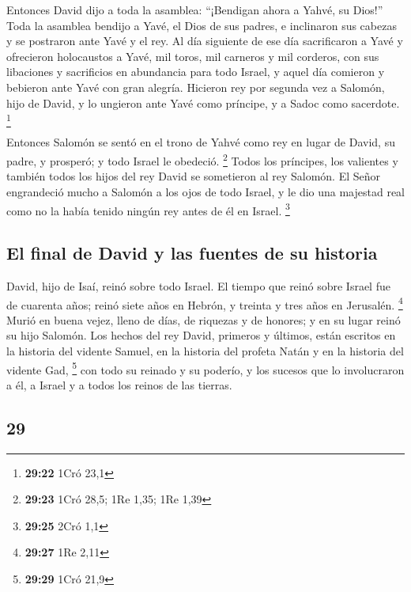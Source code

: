 \begin{paracol}{2}
 Entonces David dijo a toda la asamblea: ``¡Bendigan
ahora a Yahvé, su Dios!'' Toda la asamblea bendijo a Yavé, el Dios de
sus padres, e inclinaron sus cabezas y se postraron ante Yavé y el rey.
 Al día siguiente de ese día sacrificaron a Yavé y
ofrecieron holocaustos a Yavé, mil toros, mil carneros y mil corderos,
con sus libaciones y sacrificios en abundancia para todo Israel,
 y aquel día comieron y bebieron ante Yavé con gran
alegría. Hicieron rey por segunda vez a Salomón, hijo de David, y lo
ungieron ante Yavé como príncipe, y a Sadoc como sacerdote. \footnote{\textbf{29:22}
  1Cró 23,1}

 Entonces Salomón se sentó en el trono de Yahvé como rey
en lugar de David, su padre, y prosperó; y todo Israel le obedeció.
\footnote{\textbf{29:23} 1Cró 28,5; 1Re 1,35; 1Re 1,39} 
Todos los príncipes, los valientes y también todos los hijos del rey
David se sometieron al rey Salomón.  El Señor engrandeció
mucho a Salomón a los ojos de todo Israel, y le dio una majestad real
como no la había tenido ningún rey antes de él en Israel. \footnote{\textbf{29:25}
  2Cró 1,1}

\hypertarget{el-final-de-david-y-las-fuentes-de-su-historia}{%
\subsection{El final de David y las fuentes de su
historia}\label{el-final-de-david-y-las-fuentes-de-su-historia}}

 David, hijo de Isaí, reinó sobre todo Israel.
 El tiempo que reinó sobre Israel fue de cuarenta años;
reinó siete años en Hebrón, y treinta y tres años en Jerusalén.
\footnote{\textbf{29:27} 1Re 2,11}  Murió en buena vejez,
lleno de días, de riquezas y de honores; y en su lugar reinó su hijo
Salomón.  Los hechos del rey David, primeros y últimos,
están escritos en la historia del vidente Samuel, en la historia del
profeta Natán y en la historia del vidente Gad, \footnote{\textbf{29:29}
  1Cró 21,9}  con todo su reinado y su poderío, y los
sucesos que lo involucraron a él, a Israel y a todos los reinos de las
tierras. \switchcolumn \begin{otherlanguage}{english}

\hypertarget{section-57}{%
\section{29}\label{section-57}}


\end{otherlanguage}
\end{paracol}
